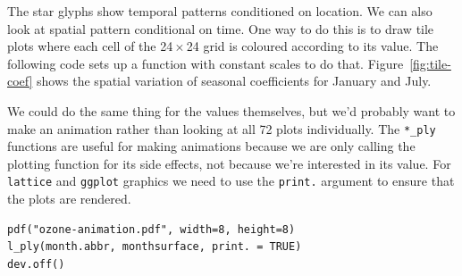 \documentclass{scrartcl}
\newcommand{\code}[1]{\lstinline!#1!}
\newcommand{\x}{\,$\times$\,}
\begin{document}
%


The star glyphs show temporal patterns conditioned on location.  We can also look at spatial pattern conditional on time.  One way to do this is to draw tile plots where each cell of the 24\x24 grid is coloured according to its value.  The following code sets up a function with constant scales to do that.  Figure~\ref{fig:tile-coef} shows the spatial variation of seasonal coefficients for January and July.  

% 


We could do the same thing for the values themselves, but we'd probably want to make an animation rather than looking at all 72 plots individually.  The \code{*_ply} functions are useful for making animations because we are only calling the plotting function for its side effects, not because we're interested in its value.  For \code{lattice} and \code{ggplot} graphics we need to use the \code{print.} argument to ensure that the plots are rendered.

\begin{verbatim}
pdf("ozone-animation.pdf", width=8, height=8)
l_ply(month.abbr, monthsurface, print. = TRUE)
dev.off()
\end{verbatim}

% 

\end{document}
